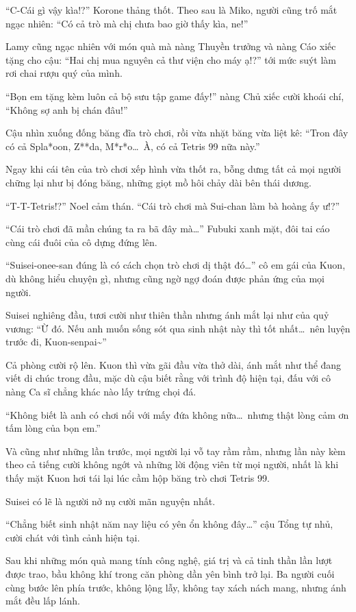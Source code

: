 \documentclass[../main.tex]{subfiles}
\begin{document}
``C-Cái gì vậy kìa!?'' Korone thảng thốt. Theo sau là Miko, người cũng trố mắt ngạc nhiên: ``Có cả trò mà chị chưa bao giờ thấy kìa, ne!''

Lamy cũng ngạc nhiên với món quà mà nàng Thuyền trưởng và nàng Cáo xiếc tặng cho cậu: ``Hai chị mua nguyên cả thư viện cho máy ạ!?'' tới mức suýt làm rơi chai rượu quý của mình.

``Bọn em tặng kèm luôn cả bộ sưu tập game đấy!''  nàng Chủ xiếc cười khoái chí, ``Không sợ anh bị chán đâu!''

Cậu nhìn xuống đống băng đĩa trò chơi, rồi vừa nhặt băng vừa liệt kê: ``Tron đây có cả Spla*oon, Z**da, M*r*o\dots\ À, có cả Tetris 99 nữa này.''

Ngay khi cái tên của trò chơi xếp hình vừa thốt ra, bỗng dưng tất cả mọi người chững lại như bị đóng băng, những giọt mồ hôi chảy dài bên thái dương.

``T-T-Tetris!?'' Noel cảm thán. ``Cái trò chơi mà Sui-chan làm bà hoàng ấy ư!?''

``Cái trò chơi đã mần chúng ta ra bã đây mà\dots'' Fubuki xanh mặt, đôi tai cáo cùng cái đuôi của cô dựng đứng lên.

``Suisei-onee-san đúng là có cách chọn trò chơi dị thật đó\dots'' cô em gái của Kuon, dù không hiểu chuyện gì, nhưng cũng ngờ ngợ đoán được phản ứng của mọi người.

Suisei nghiêng đầu, tươi cười như thiên thần nhưng ánh mắt lại như của quỷ vương: ``Ừ đó. Nếu anh muốn sống sót qua sinh nhật này thì tốt nhất\dots\ nên luyện trước đi, Kuon-senpai\~{}''

Cả phòng cười rộ lên. Kuon thì vừa gãi đầu vừa thở dài, ánh mắt như thể đang viết di chúc trong đầu, mặc dù cậu biết rằng với trình độ hiện tại, đấu với cô nàng Ca sĩ chẳng khác nào lấy trứng chọi đá.

``Không biết là anh có chơi nổi với mấy đứa không nữa\dots\ nhưng thật lòng cảm ơn tấm lòng của bọn em.''

Và cũng như những lần trước, mọi người lại vỗ tay rầm rầm, nhưng lần này kèm theo cả tiếng cười không ngớt và những lời động viên từ mọi người, nhất là khi thấy mặt Kuon hơi tái lại lúc cầm hộp băng trò chơi Tetris 99.

Suisei có lẽ là người nở nụ cười mãn nguyện nhất.

``Chẳng biết sinh nhật năm nay liệu có yên ổn không đây\dots'' cậu Tổng tự nhủ, cười chát với tình cảnh hiện tại.

Sau khi những món quà mang tính công nghệ, giá trị và cả tinh thần lần lượt được trao, bầu không khí trong căn phòng dần yên bình trở lại. Ba người cuối cùng bước lên phía trước, không lộng lẫy, không tay xách nách mang, nhưng ánh mắt đều lấp lánh.
\end{document}
